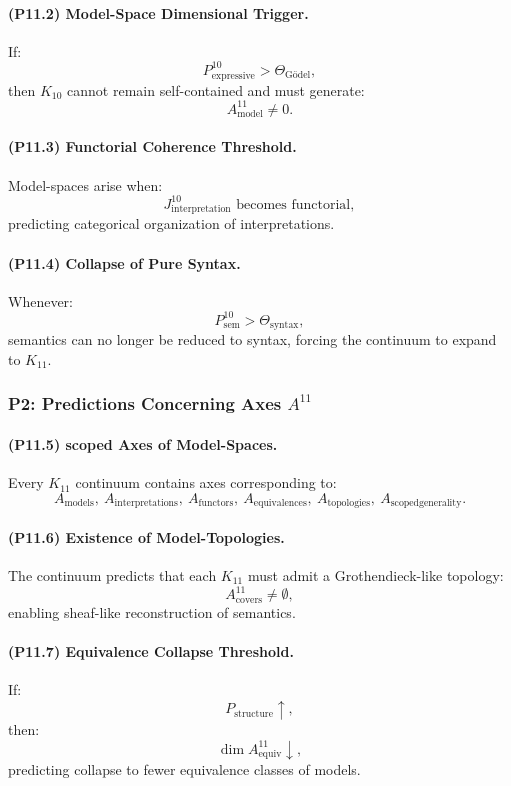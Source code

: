 \paragraph{(P11.2) Model-Space Dimensional Trigger.}
If:
\[
P_{\mathrm{expressive}}^{10} > \Theta_{\mathrm{Gödel}},
\]
then $K_{10}$ cannot remain self-contained and must generate:
\[
A_{\mathrm{model}}^{11} \neq 0.
\]

\paragraph{(P11.3) Functorial Coherence Threshold.}
Model-spaces arise when:
\[
J_{\mathrm{interpretation}}^{10}
\text{ becomes functorial},
\]
predicting categorical organization of interpretations.

\paragraph{(P11.4) Collapse of Pure Syntax.}
Whenever:
\[
P_{\mathrm{sem}}^{10} > \Theta_{\mathrm{syntax}},
\]
semantics can no longer be reduced to syntax,
forcing the continuum to expand to $K_{11}$.

\subsubsection{P2: Predictions Concerning Axes $A^{11}$}

\paragraph{(P11.5) scoped Axes of Model-Spaces.}
Every $K_{11}$ continuum contains axes corresponding to:
\[
A_{\mathrm{models}},\
A_{\mathrm{interpretations}},\
A_{\mathrm{functors}},\
A_{\mathrm{equivalences}},\
A_{\mathrm{topologies}},\
A_{\mathrm{scoped generality}}.
\]

\paragraph{(P11.6) Existence of Model-Topologies.}
The continuum predicts that each $K_{11}$ must admit a
Grothendieck-like topology:
\[
A_{\mathrm{covers}}^{11} \neq \emptyset,
\]
enabling sheaf-like reconstruction of semantics.

\paragraph{(P11.7) Equivalence Collapse Threshold.}
If:
\[
P_{\mathrm{structure}} \uparrow,
\]
then:
\[
\dim A_{\mathrm{equiv}}^{11} \downarrow,
\]
predicting collapse to fewer equivalence classes of models.

